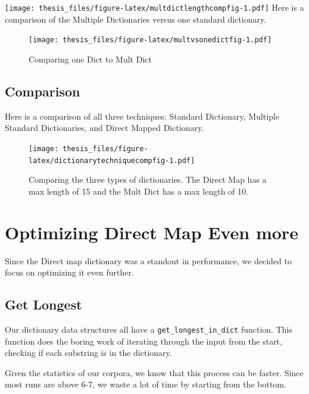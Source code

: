 \documentclass[12pt,twoside]{reedthesis}
\begin{document}
\texttt{[image: thesis\_files/figure-latex/multdictlengthcompfig-1.pdf]}
Here is a comparison of the Multiple Dictionaries versus one standard dictionary.
\begin{figure}
\centering
\texttt{[image: thesis\_files/figure-latex/multvsonedictfig-1.pdf]}
\caption{\label{fig:multvsonedictfig}Comparing one Dict to Mult Dict}
\end{figure}
\hypertarget{comparison}{%
\subsection{Comparison}\label{comparison}}

Here is a comparison of all three techniques: Standard Dictionary, Multiple Standard Dictionaries, and Direct Mapped Dictionary.
\begin{figure}
\centering
\texttt{[image: thesis\_files/figure-latex/dictionarytechniquecompfig-1.pdf]}
\caption{\label{fig:dictionarytechniquecompfig}Comparing the three types of dictionaries. The Direct Map has a max length of 15 and the Mult Dict has a max length of 10.}
\end{figure}
\hypertarget{optimizing-direct-map-even-more}{%
\section{Optimizing Direct Map Even more}\label{optimizing-direct-map-even-more}}

Since the Direct map dictionary was a standout in performance, we decided to focus on optimizing it even further.

\hypertarget{get-longest}{%
\subsection{Get Longest}\label{get-longest}}

Our dictionary data structures all have a \texttt{get\_longest\_in\_dict} function. This function does the boring work of iterating through the input from the start, checking if each substring is in the dictionary.

Given the statistics of our corpora, we know that this process can be faster. Since most runs are above 6-7, we waste a lot of time by starting from the bottom.
\end{document}
